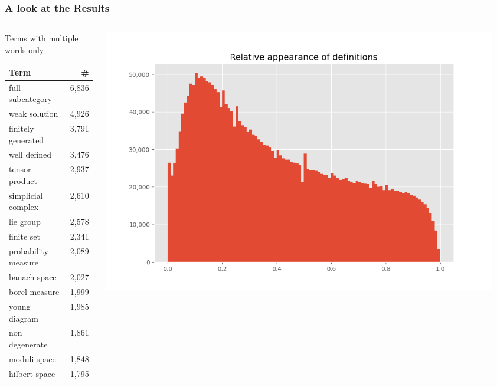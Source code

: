 \documentclass[10pt]{beamer}
\begin{document}
\begin{frame}
    \frametitle{A look at the Results}
    \begin{columns}
        \begin{column}{0.4\textwidth}
            Terms with multiple words only \\
            \begin{tabular}{lr}
                \toprule
                \textbf{Term} & \textbf{\#}  \\
                \midrule
full subcategory &  6,836 \\
weak solution &  4,926 \\
finitely generated &  3,791 \\
well defined &  3,476 \\
tensor product &  2,937 \\
simplicial complex &  2,610 \\
lie group &  2,578 \\
finite set &  2,341 \\
probability measure &  2,089 \\
banach space &  2,027 \\
borel measure &  1,999 \\
young diagram &  1,985 \\
non degenerate &  1,861 \\
moduli space &  1,848 \\
hilbert space &  1,795 \\
\bottomrule
            \end{tabular}
        \end{column}
        \begin{column}{0.6\textwidth}
            \begin{center}
                \includegraphics[width=0.95\textwidth]{../Images/rel_appe.png}


\end{center}
\end{column}
\end{columns}
\end{frame}
\end{document}
